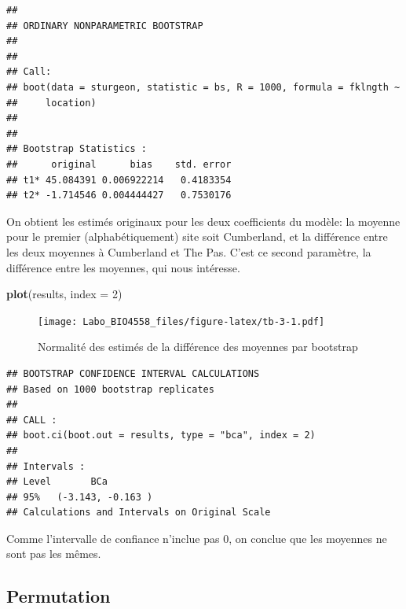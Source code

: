 \documentclass[12pt,]{book}
\newenvironment{Shaded}{\begin{snugshade}}{\end{snugshade}}
\newcommand{\CommentTok}[1]{\textcolor[rgb]{0.56,0.35,0.01}{\textit{#1}}}
\newcommand{\DataTypeTok}[1]{\textcolor[rgb]{0.13,0.29,0.53}{#1}}
\newcommand{\DecValTok}[1]{\textcolor[rgb]{0.00,0.00,0.81}{#1}}
\newcommand{\KeywordTok}[1]{\textcolor[rgb]{0.13,0.29,0.53}{\textbf{#1}}}
\newcommand{\NormalTok}[1]{#1}
\newcommand{\StringTok}[1]{\textcolor[rgb]{0.31,0.60,0.02}{#1}}
\begin{document}
\begin{verbatim}
## 
## ORDINARY NONPARAMETRIC BOOTSTRAP
## 
## 
## Call:
## boot(data = sturgeon, statistic = bs, R = 1000, formula = fklngth ~ 
##     location)
## 
## 
## Bootstrap Statistics :
##      original      bias    std. error
## t1* 45.084391 0.006922214   0.4183354
## t2* -1.714546 0.004444427   0.7530176
\end{verbatim}

On obtient les estimés originaux pour les deux coefficients du modèle: la moyenne pour le premier (alphabétiquement) site soit Cumberland, et la différence entre les deux moyennes à Cumberland et The Pas. C'est ce second paramètre, la différence entre les moyennes, qui nous intéresse.

\begin{Shaded}
\begin{Highlighting}[]
\KeywordTok{plot}\NormalTok{(results, }\DataTypeTok{index =} \DecValTok{2}\NormalTok{)}
\end{Highlighting}
\end{Shaded}

\begin{figure}
\centering
\texttt{[image: Labo\_BIO4558\_files/figure-latex/tb-3-1.pdf]}
\caption{\label{fig:tb-3}Normalité des estimés de la différence des moyennes par bootstrap}
\end{figure}

\begin{Shaded}
\end{Shaded}

\begin{verbatim}
## BOOTSTRAP CONFIDENCE INTERVAL CALCULATIONS
## Based on 1000 bootstrap replicates
## 
## CALL : 
## boot.ci(boot.out = results, type = "bca", index = 2)
## 
## Intervals : 
## Level       BCa          
## 95%   (-3.143, -0.163 )  
## Calculations and Intervals on Original Scale
\end{verbatim}

Comme l'intervalle de confiance n'inclue pas 0, on conclue que les moyennes ne sont pas les mêmes.

\hypertarget{permutation}{%
\subsection{Permutation}\label{permutation}}
\end{document}
